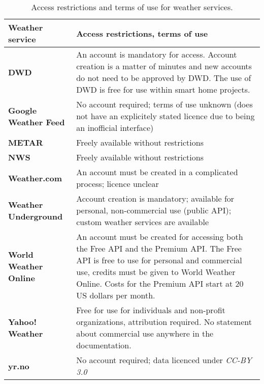 \begin{table}
\centering
\begin{tabular}{|p{}|p{}|}
  \hline
  \textbf{Weather service} & \textbf{Access restrictions, terms of use} \\
  \hline\hline
  \textbf{DWD} & An account is mandatory for access. Account creation is a matter of minutes and new accounts do not need to be approved by DWD. The use of DWD is free for use within smart home projects.\\
  \hline
  \textbf{Google Weather Feed} & No account required; terms of use unknown (does not have an explicitely stated licence due to being an inofficial interface) \\
  \hline
  \textbf{\acs{METAR}} & Freely available without restrictions \\
  \hline
  \textbf{\acs{NWS}} & Freely available without restrictions \\
  \hline
  \textbf{Weather.com} & An account must be created in a complicated process; licence unclear \\
  \hline
  \textbf{Weather Underground} & Account creation is mandatory; available for personal, non-commercial use (public API); custom weather services are available \\
  \hline
  \textbf{World Weather Online} & An account must be created for accessing both the Free API and the Premium API. The Free API is free to use for personal and commercial use, credits must be given to World Weather Online. Costs for the Premium API start at 20 US dollars per month.\\
  \hline
  \textbf{Yahoo! Weather} & Free for use for individuals and non-profit organizations, attribution required. No statement about commercial use anywhere in the documentation.\\
  \hline
  \textbf{yr.no} & No account required; data licenced under \emph{CC-BY 3.0}~\cite{ccby30}\\
  \hline
\end{tabular}
\caption{Access restrictions and terms of use for weather services.}
\label{table:weather_data4}
\end{table}

